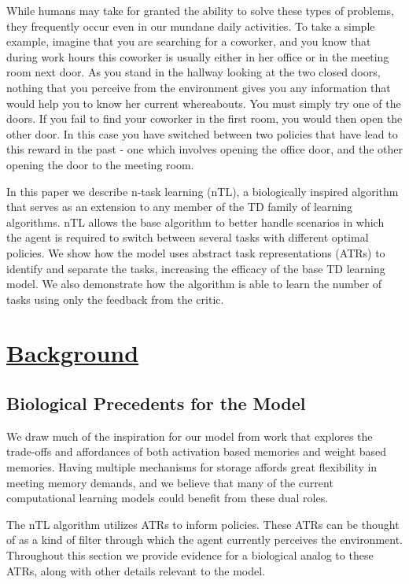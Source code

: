 \documentclass[10pt,letterpaper]{article}
\begin{document}
While humans may take for granted the ability to solve these types of problems, they frequently occur even in our mundane daily activities. To take a simple example, imagine that you are searching for a coworker, and you know that during work hours this coworker is usually either in her office or in the meeting room next door. As you stand in the hallway looking at the two closed doors, nothing that you perceive from the environment gives you any information that would help you to know her current whereabouts. You must simply try one of the doors. If you fail to find your coworker in the first room, you would then open the other door. In this case you have switched between two policies that have lead to this reward in the past - one which involves opening the office door, and the other opening the door to the meeting room.

In this paper we describe n-task learning (nTL), a biologically inspired algorithm that serves as an extension to any member of the TD family of learning algorithms. nTL allows the base algorithm to better handle scenarios in which the agent is required to switch between several tasks with different optimal policies. We show how the model uses abstract task representations (ATRs) to identify and separate the tasks, increasing the efficacy of the base TD learning model. We also demonstrate how the algorithm is able to learn the number of tasks using only the feedback from the critic.

\section{\underline{Background}}

\subsection{Biological Precedents for the Model}

We draw much of the inspiration for our model from work that explores the trade-offs and affordances of both activation based memories and weight based memories. Having multiple mechanisms for storage affords great flexibility in meeting memory demands, and we believe that many of the current computational learning models could benefit from these dual roles.

The nTL algorithm utilizes ATRs to inform policies. These ATRs can be thought of as a kind of filter through which the agent currently perceives the environment. Throughout this section we provide evidence for a biological analog to these ATRs, along with other details relevant to the model.
\end{document}
